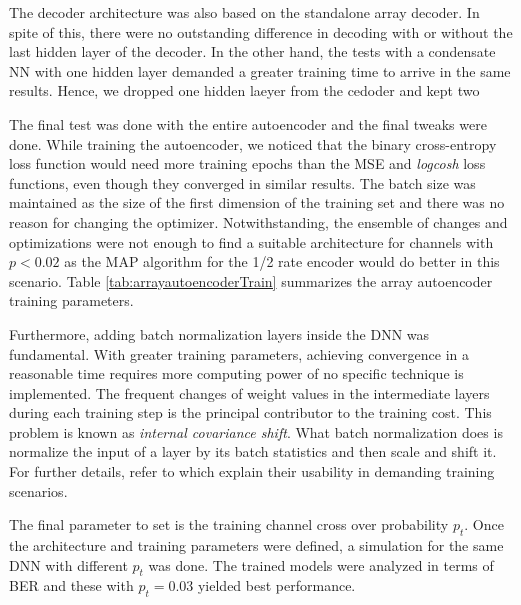 \documentclass[conference]{IEEEtran}
\begin{document}
The decoder architecture was also based on the standalone array decoder. In spite of this, there were no outstanding difference in decoding with or without the last hidden layer of the decoder. In the other hand, the tests with a condensate NN with one hidden layer demanded a greater training time to arrive in the same results. Hence, we dropped one hidden laeyer from the cedoder and kept two

The final test was done with the entire autoencoder and the final tweaks were done. While training the autoencoder, we noticed that the binary cross-entropy loss function would need more training epochs than the MSE and \textit{logcosh} loss functions, even though they converged in similar results. The batch size was maintained as the size of the first dimension of the training set and there was no reason for changing the optimizer. Notwithstanding, the ensemble of changes and optimizations were not enough to find a suitable architecture for channels with $p<0.02$ as the MAP algorithm for the 1/2 rate encoder would do better in this scenario. Table \ref{tab:arrayautoencoderTrain} summarizes the array autoencoder training parameters.

Furthermore, adding batch normalization layers inside the DNN was fundamental. With greater training parameters, achieving convergence in a reasonable time requires more computing power of no specific technique is implemented. The frequent changes of weight values in the intermediate layers during each training step   is the principal contributor to the training cost. This problem is known as \textit{internal covariance shift}. What batch normalization does is normalize the input of a layer by its batch statistics and then scale and shift it. For further details, refer to \cite{DBLP:journals/corr/IoffeS15} which explain their usability in demanding training scenarios.

The final parameter to set is the training channel cross over probability $p_t$. Once the architecture and training parameters were defined, a simulation for the same DNN with different $p_t$ was done. The trained models were analyzed in terms of BER and these with $p_t=0.03$ yielded best performance.
\end{document}
